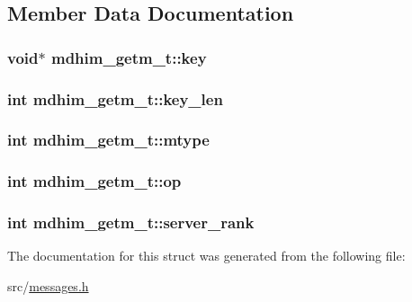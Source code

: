 \subsection{Member Data Documentation}
\hypertarget{structmdhim__getm__t_a53c3aff6037a3e693e09ff4e98bd7eba}{
\subsubsection[{key}]{\setlength{\rightskip}{0pt plus 5cm}void$\ast$ mdhim\-\_\-getm\-\_\-t\-::key}}\label{d9/d54/structmdhim__getm__t_a53c3aff6037a3e693e09ff4e98bd7eba}
\hypertarget{structmdhim__getm__t_a8942a21db02e749c3f3b04b32fea795e}{
\subsubsection[{key\-\_\-len}]{\setlength{\rightskip}{0pt plus 5cm}int mdhim\-\_\-getm\-\_\-t\-::key\-\_\-len}}\label{d9/d54/structmdhim__getm__t_a8942a21db02e749c3f3b04b32fea795e}
\hypertarget{structmdhim__getm__t_a803aef9942bd6bd39d10c22f4f1205d3}{
\subsubsection[{mtype}]{\setlength{\rightskip}{0pt plus 5cm}int mdhim\-\_\-getm\-\_\-t\-::mtype}}\label{d9/d54/structmdhim__getm__t_a803aef9942bd6bd39d10c22f4f1205d3}
\hypertarget{structmdhim__getm__t_a81dd92f402e433928b8b3bae7ccdefd8}{
\subsubsection[{op}]{\setlength{\rightskip}{0pt plus 5cm}int mdhim\-\_\-getm\-\_\-t\-::op}}\label{d9/d54/structmdhim__getm__t_a81dd92f402e433928b8b3bae7ccdefd8}
\hypertarget{structmdhim__getm__t_a2fe10e46b27b008657d3c59299ea1fd6}{
\subsubsection[{server\-\_\-rank}]{\setlength{\rightskip}{0pt plus 5cm}int mdhim\-\_\-getm\-\_\-t\-::server\-\_\-rank}}\label{d9/d54/structmdhim__getm__t_a2fe10e46b27b008657d3c59299ea1fd6}


The documentation for this struct was generated from the following file\-:\begin{DoxyCompactItemize}
\item 
src/\hyperlink{messages_8h}{messages.\-h}\end{DoxyCompactItemize}
